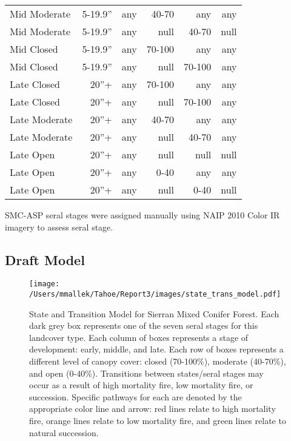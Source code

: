 \begin{table}[]
\begin{tabular}{@{}lrrrrr@{}}
Mid Moderate     & 5-19.9''        & any & 40-70  & any    & any  \\
Mid Moderate     & 5-19.9''        & any & null   & 40-70  & null \\
Mid Closed       & 5-19.9''        & any & 70-100 & any    & any  \\
Mid Closed       & 5-19.9''        & any & null   & 70-100 & any  \\
Late Closed      & 20''+           & any & 70-100 & any    & any  \\
Late Closed      & 20''+           & any & null   & 70-100 & any  \\
Late Moderate    & 20''+           & any & 40-70  & any    & any  \\
Late Moderate    & 20''+           & any & null   & 40-70  & any  \\
Late Open        & 20''+           & any & null   & null   & null \\
Late Open        & 20''+           & any & 0-40   & any    & any  \\
Late Open        & 20''+           & any & null   & 0-40   & null  \\ \bottomrule
\end{tabular}
\end{table}

SMC-ASP seral stages were assigned manually using NAIP 2010 Color IR imagery to assess seral stage.

\subsection*{Draft Model}
\begin{figure}[htbp]
\centering
\texttt{[image: /Users/mmallek/Tahoe/Report3/images/state\_trans\_model.pdf]}
\caption{State and Transition Model for Sierran Mixed Conifer Forest. Each dark grey box represents one of the seven seral stages for this landcover type. Each column of boxes represents a stage of development: early, middle, and late. Each row of boxes represents a different level of canopy cover: closed (70-100\%), moderate (40-70\%), and open (0-40\%). Transitions between states/seral stages may occur as a result of high mortality fire, low mortality fire, or succession. Specific pathways for each are denoted by the appropriate color line and arrow: red lines relate to high mortality fire, orange lines relate to low mortality fire, and green lines relate to natural succession.} 
\label{transmodel}
\end{figure}

